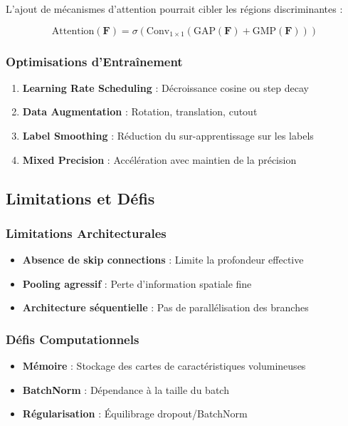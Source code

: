 \documentclass[12pt,a4paper]{article}
\begin{document}
L'ajout de mécanismes d'attention pourrait cibler les régions discriminantes :

$$\text{Attention}(\mathbf{F}) = \sigma(\text{Conv}_{1 \times 1}(\text{GAP}(\mathbf{F}) + \text{GMP}(\mathbf{F})))$$

\subsubsection{Optimisations d'Entraînement}

\begin{enumerate}
    \item \textbf{Learning Rate Scheduling} : Décroissance cosine ou step decay
    \item \textbf{Data Augmentation} : Rotation, translation, cutout
    \item \textbf{Label Smoothing} : Réduction du sur-apprentissage sur les labels
    \item \textbf{Mixed Precision} : Accélération avec maintien de la précision
\end{enumerate}

\subsection{Limitations et Défis}

\subsubsection{Limitations Architecturales}

\begin{itemize}
    \item \textbf{Absence de skip connections} : Limite la profondeur effective
    \item \textbf{Pooling agressif} : Perte d'information spatiale fine
    \item \textbf{Architecture séquentielle} : Pas de parallélisation des branches
\end{itemize}

\subsubsection{Défis Computationnels}

\begin{itemize}
    \item \textbf{Mémoire} : Stockage des cartes de caractéristiques volumineuses
    \item \textbf{BatchNorm} : Dépendance à la taille du batch
    \item \textbf{Régularisation} : Équilibrage dropout/BatchNorm
\end{itemize}
\end{document}
